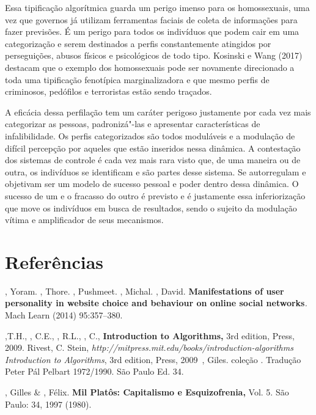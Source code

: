 Essa tipificação algorítmica guarda um perigo imenso para os
homossexuais, uma vez que governos já utilizam ferramentas faciais de
coleta de informações para fazer previsões. É um perigo para todos os
indivíduos que podem cair em uma categorização e serem destinados a
perfis constantemente atingidos por perseguições, abusos físicos e
psicológicos de todo tipo. Kosinski e Wang (2017) destacam que o exemplo
dos homossexuais pode ser novamente direcionado a toda uma tipificação
fenotípica marginalizadora e que mesmo perfis de criminosos, pedófilos e
terroristas estão sendo traçados.

A eficácia dessa perfilação tem um caráter perigoso justamente por cada
vez mais categorizar as pessoas, padronizá"-las e apresentar
características de infalibilidade. Os perfis categorizados são todos
moduláveis e a modulação de difícil percepção por aqueles que estão
inseridos nessa dinâmica. A contestação dos sistemas de controle é cada
vez mais rara visto que, de uma maneira ou de outra, os indivíduos se
identificam e são partes desse sistema. Se autorregulam e objetivam ser
um modelo de sucesso pessoal e poder dentro dessa dinâmica. O sucesso de
um e o fracasso do outro é previsto e é justamente essa inferiorização
que move os indivíduos em busca de resultados, sendo o sujeito da
modulação vítima e amplificador de seus mecanismos.

\section{Referências}

, Yoram. , Thore. , Pushmeet. , Michal.
, David. \textbf{Manifestations of user personality in website
choice and behaviour on online social networks}\emph{.} Mach Learn
(2014) 95:357--380.

,T.H., , C.E., , R.L., , C.,
\textbf{Introduction to Algorithms,} 3rd edition,  Press, 2009.
Rivest, C.
Stein, \emph{http://mitpress.mit.edu/books/introduction-algorithms} {\emph{Introduction
to Algorithms}}, 3rd edition,  Press, 2009~, Giles.
\textbf{} coleção . Tradução Peter Pál Pelbart
1972/1990. São Paulo Ed. 34.

, Gilles \& , Félix. \textbf{Mil Platôs: Capitalismo e
Esquizofrenia,} Vol. 5. São Paulo: 34, 1997 (1980).

